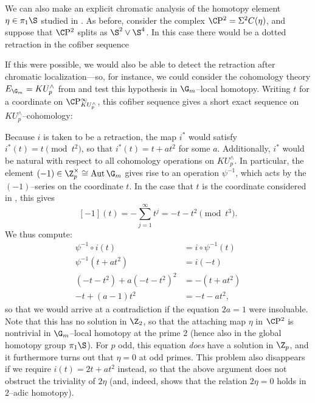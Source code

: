 \begin{example}
We can also make an explicit chromatic analysis of the homotopy element \(\eta \in \pi_1 \S\) studied in .  As before, consider the complex \(\CP^2 = \Susp^2 C(\eta)\), and suppose that \(\CP^2\) splits as \(\S^2 \vee \S^4\).  In this case there would be a dotted retraction in the cofiber sequence
\begin{center}
\end{center}
If this were possible, we would also be able to detect the retraction after chromatic localization---so, for instance, we could consider the cohomology theory \(E_{\G_m} = KU^\wedge_p\) from  and test this hypothesis in \(\G_m\)--local homotopy.  Writing \(t\) for a coordinate on \(\CP^\infty_{KU^\wedge_p}\), this cofiber sequence gives a short exact sequence on \(KU^\wedge_p\)--cohomology:
\begin{center}
\end{center}
Because \(i\) is taken to be a retraction, the map \(i^*\) would satisfy \(i^*(t) = t \pmod{t^2}\), so that \(i^*(t) = t + at^2\) for some \(a\).  Additionally, \(i^*\) would be natural with respect to all cohomology operations on \(KU^\wedge_p\).  In particular, the element \((-1) \in \Z_p^\times \cong \Aut \G_m\) gives rise to an operation \(\psi^{-1}\), which acts by the \((-1)\)--series on the coordinate \(t\).  In the case that \(t\) is the coordinate considered in , this gives \[[-1](t) = -\sum_{j=1}^\infty t^j = -t - t^2 \pmod{t^3}.\]  We thus compute:
\begin{align*}
\psi^{-1} \circ i(t) & = i \circ \psi^{-1}(t) \\
\psi^{-1}(t + at^2) & = i(-t) \\
(-t - t^2) + a(-t - t^2)^2 & = -(t + at^2) \\
-t + (a - 1) t^2 & = -t - at^2,
\end{align*}
so that we would arrive at a contradiction if the equation \(2a = 1\) were insoluable.  Note that this has no solution in \(\Z_2\), so that the attaching map \(\eta\) in \(\CP^2\) is nontrivial in \(\G_m\)--local homotopy at the prime \(2\) (hence also in the global homotopy group \(\pi_1 \S\)).  For \(p\) odd, this equation \emph{does} have a solution in \(\Z_p\), and it furthermore turns out that \(\eta = 0\) at odd primes.  This problem also disappears if we require \(i(t) = 2t + at^2\) instead, so that the above argument does not obstruct the triviality of \(2 \eta\) (and, indeed,  shows that the relation \(2 \eta = 0\) holds in \(2\)--adic homotopy).
\end{example}

